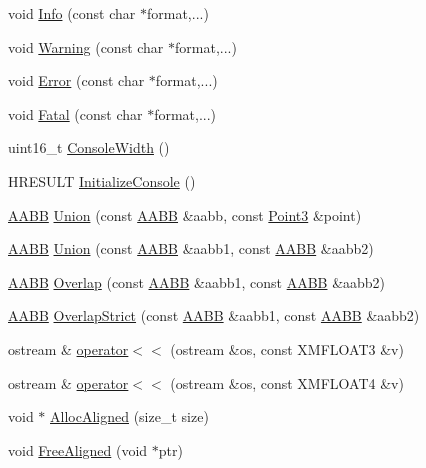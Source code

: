 \begin{DoxyCompactItemize}
\item 
void \hyperlink{namespacemage_add6aa5f13960ce07b20f48d273956a91}{Info} (const char $\ast$format,...)
\item 
void \hyperlink{namespacemage_a0eccd8065c75d5f2bf86b48a5be3bfe5}{Warning} (const char $\ast$format,...)
\item 
void \hyperlink{namespacemage_a52a7fe8c9ce39afd9e0b0299373db0fa}{Error} (const char $\ast$format,...)
\item 
void \hyperlink{namespacemage_aefd40c91591a8e0423e4222b4a5e6249}{Fatal} (const char $\ast$format,...)
\item 
uint16\+\_\+t \hyperlink{namespacemage_a2988e0e46e373691a189ea97135f1ed1}{Console\+Width} ()
\item 
H\+R\+E\+S\+U\+LT \hyperlink{namespacemage_a14798232aabfdf96d751f4fcca4e6ece}{Initialize\+Console} ()
\item 
\hyperlink{structmage_1_1_a_a_b_b}{A\+A\+BB} \hyperlink{namespacemage_ae9ff69102d392718bf8636b90c825a8d}{Union} (const \hyperlink{structmage_1_1_a_a_b_b}{A\+A\+BB} \&aabb, const \hyperlink{structmage_1_1_point3}{Point3} \&point)
\item 
\hyperlink{structmage_1_1_a_a_b_b}{A\+A\+BB} \hyperlink{namespacemage_ab9b3a22c6c2fc5537f00bf4f7516746f}{Union} (const \hyperlink{structmage_1_1_a_a_b_b}{A\+A\+BB} \&aabb1, const \hyperlink{structmage_1_1_a_a_b_b}{A\+A\+BB} \&aabb2)
\item 
\hyperlink{structmage_1_1_a_a_b_b}{A\+A\+BB} \hyperlink{namespacemage_a1068090c66ff1c6398b134455730eb02}{Overlap} (const \hyperlink{structmage_1_1_a_a_b_b}{A\+A\+BB} \&aabb1, const \hyperlink{structmage_1_1_a_a_b_b}{A\+A\+BB} \&aabb2)
\item 
\hyperlink{structmage_1_1_a_a_b_b}{A\+A\+BB} \hyperlink{namespacemage_a47de3c8ef21f996ee234f83bb51b12e5}{Overlap\+Strict} (const \hyperlink{structmage_1_1_a_a_b_b}{A\+A\+BB} \&aabb1, const \hyperlink{structmage_1_1_a_a_b_b}{A\+A\+BB} \&aabb2)
\item 
ostream \& \hyperlink{namespacemage_a44b2d3046802608544402245919f219b}{operator$<$$<$} (ostream \&os, const X\+M\+F\+L\+O\+A\+T3 \&v)
\item 
ostream \& \hyperlink{namespacemage_af6c1d1c5718d611450932bde30d2bfef}{operator$<$$<$} (ostream \&os, const X\+M\+F\+L\+O\+A\+T4 \&v)
\item 
void $\ast$ \hyperlink{namespacemage_a6c97f75df305a5e0a945e82a26e75c38}{Alloc\+Aligned} (size\+\_\+t size)
\item 
void \hyperlink{namespacemage_a401c54df21447c491c527735647b5f80}{Free\+Aligned} (void $\ast$ptr)

\end{DoxyCompactItemize}
